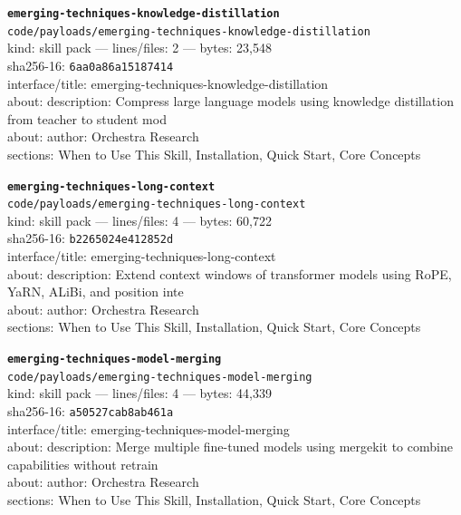 \noindent\textbf{\texttt{emerging-techniques-knowledge-distillation}}\\
\texttt{code/payloads/emerging-techniques-knowledge-distillation}\\
kind: skill pack --- lines/files: 2 --- bytes: 23,548\\
sha256-16: \texttt{6aa0a86a15187414}\\
interface/title: emerging-techniques-knowledge-distillation\\
about: description: Compress large language models using knowledge distillation from teacher to student mod\\
about: author: Orchestra Research\\
sections: When to Use This Skill, Installation, Quick Start, Core Concepts\\
\vspace*{6.0pt}

\noindent\textbf{\texttt{emerging-techniques-long-context}}\\
\texttt{code/payloads/emerging-techniques-long-context}\\
kind: skill pack --- lines/files: 4 --- bytes: 60,722\\
sha256-16: \texttt{b2265024e412852d}\\
interface/title: emerging-techniques-long-context\\
about: description: Extend context windows of transformer models using RoPE, YaRN, ALiBi, and position inte\\
about: author: Orchestra Research\\
sections: When to Use This Skill, Installation, Quick Start, Core Concepts\\
\vspace*{6.0pt}
\newpage

\noindent\textbf{\texttt{emerging-techniques-model-merging}}\\
\texttt{code/payloads/emerging-techniques-model-merging}\\
kind: skill pack --- lines/files: 4 --- bytes: 44,339\\
sha256-16: \texttt{a50527cab8ab461a}\\
interface/title: emerging-techniques-model-merging\\
about: description: Merge multiple fine-tuned models using mergekit to combine capabilities without retrain\\
about: author: Orchestra Research\\
sections: When to Use This Skill, Installation, Quick Start, Core Concepts\\
\vspace*{6.0pt}

